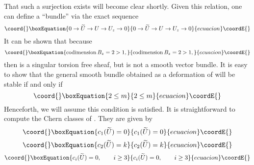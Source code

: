 \documentclass[a4paper,12pt]{article}
\numberwithin{equation}{section}
\theoremstyle{plain}
\begin{document}
That such a surjection exists will become clear shortly. Given
this relation, one can define a ``bundle'' \coordHE{} via the
exact sequence
\begin{equation}\coord{}\boxEquation{
0 \rightarrow \widetilde{U} \rightarrow U \rightarrow U_{z}
\rightarrow 0
\label{eq:149}
}{
0 \rightarrow \widetilde{U} \rightarrow U \rightarrow U_{z}
\rightarrow 0
}{ecuacion}\coordE{}\end{equation}
It can be shown that because
\begin{equation}\coord{}\boxEquation{
\operatorname{codimension}   B_{z}= 2 > 1,
\label{eq:150}
}{
\operatorname{codimension}   B_{z}= 2 > 1,
}{ecuacion}\coordE{}\end{equation}
then \coordHE{} is a singular torsion free sheaf, but is not a smooth 
vector bundle. It is easy to show that the general smooth bundle
obtained as a deformation of \coordHE{} will be stable if and only if
\begin{equation}\coord{}\boxEquation{
2 \leq m
\label{eq:150A}
}{
2 \leq m
}{ecuacion}\coordE{}\end{equation}
Henceforth, we will assume this condition is satisfied.
It is straightforward to compute the Chern classes of
\coordHE{}. They are given by
\begin{equation}\coord{}\boxEquation{
c_{1}(\widetilde{U})=0
\label{eq:151}
}{
c_{1}(\widetilde{U})=0
}{ecuacion}\coordE{}\end{equation}
\begin{equation}\coord{}\boxEquation{
c_{2}(\widetilde{U})=k
\label{eq:152}
}{
c_{2}(\widetilde{U})=k
}{ecuacion}\coordE{}\end{equation}
\begin{equation}\coord{}\boxEquation{
c_{i}(\widetilde{U})=0, \qquad i\geq3
\label{eq:153}
}{
c_{i}(\widetilde{U})=0, \qquad i\geq3
}{ecuacion}\coordE{}\end{equation}
\end{document}
